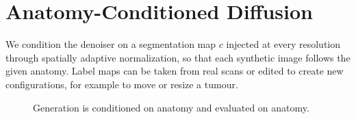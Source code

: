 \chapter{Anatomy-Conditioned Diffusion}
\label{ch:method}

We condition the denoiser on a segmentation map $c$ injected at every resolution through
spatially adaptive normalization, so that each synthetic image follows the given anatomy.
Label maps can be taken from real scans or edited to create new configurations, for example to
move or resize a tumour.

\begin{figure}[htbp]
  \centering
  \caption{Generation is conditioned on anatomy and evaluated on anatomy.}
  \label{fig:cond}
\end{figure}
